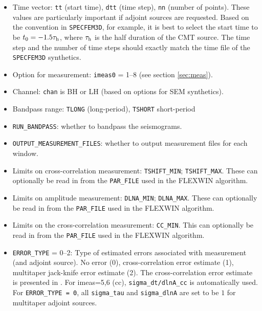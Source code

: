 \documentclass[11pt,titlepage,fleqn]{article}
\newcommand{\refSec}[1]{section \ref{#1}}
\begin{document}
\begin{itemize}
\item Time vector: \verb+tt+ (start time), \verb+dtt+ (time step), \verb+nn+ (number of points). These values are particularly important if adjoint sources are requested. Based on the convention in \verb+SPECFEM3D+, for example, it is best to select the start time to be $t_0 = -1.5 \tau_{\rm h}$, where $\tau_{\rm h}$ is the half duration of the CMT source. The time step and the number of time steps should exactly match the time file of the \verb+SPECFEM3D+ synthetics.

\item Option for measurement: \verb+imeas0+ = 1--8 (see \refSec{sec:meas}).

\item Channel: \verb+chan+ is BH or LH (based on options for SEM synthetics).

\item Bandpass range: \verb+TLONG+ (long-period), \verb+TSHORT+ short-period

\item \verb+RUN_BANDPASS+: whether to bandpass the seismograms.

\item \verb+OUTPUT_MEASUREMENT_FILES+: whether to output measurement files for each window.

\item Limits on cross-correlation measurement: \verb+TSHIFT_MIN+; \verb+TSHIFT_MAX+. These can optionally be read in from the \verb+PAR_FILE+ used in the FLEXWIN algorithm.

\item Limits on amplitude measurement: \verb+DLNA_MIN+; \verb+DLNA_MAX+. These can optionally be read in from the \verb+PAR_FILE+ used in the FLEXWIN algorithm.

\item Limits on the cross-correlation measurement: \verb+CC_MIN+. This can optionally be read in from the \verb+PAR_FILE+ used in the FLEXWIN algorithm.

\item \verb+ERROR_TYPE+ = 0--2: Type of estimated errors associated with  measurement (and adjoint source). No error (0), cross-correlation error estimate (1), multitaper jack-knife error estimate (2).  The cross-correlation error estimate is presented in \citet[][Appendix~A]{Tape2010}.  For imeas=5,6 (cc), \verb+sigma_dt/dlnA_cc+
is automatically used. For \verb+ERROR_TYPE = 0+, all \verb+sigma_tau+ and \verb+sigma_dlnA+ are set to be $1$ for multitaper adjoint sources.


\end{itemize}
\end{document}
